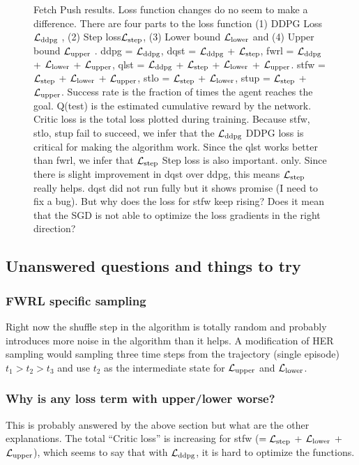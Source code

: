 \begin{figure}
  \caption{
    Fetch Push results. Loss function changes do no seem to make a difference.
    There are four parts to the loss function (1) DDPG Loss $\mathcal{L}_{\text{ddpg}}$ ,
    (2) Step loss$\mathcal{L}_{\text{step}}$,  
    (3) Lower bound $\mathcal{L}_{\text{lower}}$ and
    (4) Upper bound $\mathcal{L}_{\text{upper}}$ .
    ddpg = $\mathcal{L}_{\text{ddpg}}$,
    dqst = $\mathcal{L}_{\text{ddpg}}$ + $\mathcal{L}_{\text{step}}$,
    fwrl = $\mathcal{L}_{\text{ddpg}}$ + $\mathcal{L}_{\text{lower}}$ +
    $\mathcal{L}_{\text{upper}}$,
    qlst = $\mathcal{L}_{\text{ddpg}}$ + $\mathcal{L}_{\text{step}}$ + $\mathcal{L}_{\text{lower}}$ + $\mathcal{L}_{\text{upper}}$.
    stfw = $\mathcal{L}_{\text{step}}$ + $\mathcal{L}_{\text{lower}}$ + $\mathcal{L}_{\text{upper}}$,
    stlo = $\mathcal{L}_{\text{step}}$ + $\mathcal{L}_{\text{lower}}$,
    stup = $\mathcal{L}_{\text{step}}$ + $\mathcal{L}_{\text{upper}}$.
    Success rate is the fraction of times the agent reaches the goal. Q(test) is
    the estimated cumulative reward by the network. Critic loss is the total
    loss plotted during training.
    Because stfw, stlo, stup fail to succeed, we infer that the $\mathcal{L}_{\text{ddpg}}$ DDPG loss is
    critical for making the algorithm work. Since the qlst works better than
    fwrl, we infer that $\mathcal{L}_{\text{step}}$ Step loss is also important.
    only.
    Since there is slight improvement in dqst over ddpg, this means
    $\mathcal{L}_{\text{step}}$ really helps. dqst did not run fully but it shows
    promise (I need to fix a bug).
    But why does the loss for stfw keep rising? Does it mean that the SGD is not
    able to optimize the loss gradients in the right direction?
  }%
  \label{fig:fwrl-stepfwrl-noop-FetchPush}%
\end{figure}%
% 


\subsection{Unanswered questions and things to try}

\subsubsection{FWRL specific sampling}
Right now the shuffle step in the algorithm is totally random and probably
introduces more noise in the algorithm than it helps. A modification of HER
sampling would sampling three time steps from the trajectory (single episode)
$t_1 > t_2 > t_3$ and use $t_2$ as the intermediate state for
$\mathcal{L}_{\text{upper}}$ and $\mathcal{L}_{\text{lower}}$.


\subsubsection{Why is any loss term with upper/lower worse?}
This is probably answered by  the above section but what are the other
explanations. The total ``Critic loss'' is increasing for stfw
($=\mathcal{L}_{\text{step}}$ + $\mathcal{L}_{\text{lower}}$ + $\mathcal{L}_{\text{upper}}$),
which seems to say that with $\mathcal{L}_{\text{ddpg}}$, it is hard to optimize the functions.



